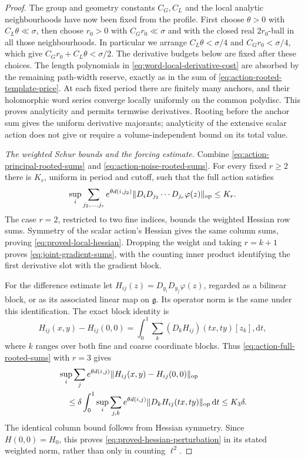 \documentclass[11pt,reqno]{amsart}
\numberwithin{equation}{section}
\theoremstyle{definition}
\theoremstyle{remark}
\newcommand{\dd}{\mathrm d}
\newcommand{\g}{\mathfrak g}
\begin{document}
\begin{proof}
The group and geometry constants \(C_G,C_L\) and the local
analytic neighbourhoods have now been fixed from the profile.
First choose \(\theta>0\) with \(C_L\theta\ll\sigma\),
then choose \(r_0>0\) with \(C_Gr_0\ll\sigma\) and with
the closed real \(2r_0\)-ball in all those neighbourhoods.
In particular we arrange
\(C_L\theta<\sigma/4\) and \(C_Gr_0<\sigma/4\), which give
\(C_Gr_0+C_L\theta<\sigma/2\).
The derivative budgets below are fixed after these choices.
The length polynomials
in \eqref{eq:word-local-derivative-cost} are absorbed by
the remaining path-width reserve, exactly as in the sum
of \eqref{eq:action-rooted-template-price}. At each fixed
period there are finitely many anchors, and their
holomorphic word series converge locally uniformly on
the common polydisc. This proves analyticity and permits
termwise derivatives. Rooting before the anchor sum
gives the uniform derivative majorants; analyticity of
the extensive scalar action does not give or require a
volume-independent bound on its total value.

\smallskip\noindent
\emph{The weighted Schur bounds and the forcing estimate.}
Combine \eqref{eq:action-principal-rooted-sums} and
\eqref{eq:action-noise-rooted-sums}. For every fixed
\(r\ge2\) there is \(K_r\), uniform in period and cutoff,
such that the full action satisfies
\begin{equation}
 \sup_i\sum_{j_2,\ldots,j_r}e^{\theta d(i,j_2)}
                \|D_iD_{j_2}\cdots D_{j_r}\varphi(z)\|_{\rm op}
                                                   \le K_r.
 \label{eq:action-full-rooted-sums}
\end{equation}
The case \(r=2\), restricted to two fine indices, bounds
the weighted Hessian row sums. Symmetry of the scalar
action's Hessian gives the same column sums, proving
\eqref{eq:proved-local-hessian}. Dropping the weight and
taking \(r=k+1\) proves \eqref{eq:joint-gradient-sums},
with the counting inner product identifying the first
derivative slot with the gradient block.

For the difference estimate let
\(H_{ij}(z)=D_{y_i}D_{y_j}\varphi(z)\), regarded as a
bilinear block, or as its associated linear map on
\(\g\). Its operator norm is the same under this
identification. The exact block identity is
\begin{equation}
 H_{ij}(x,y)-H_{ij}(0,0)
       =\int_0^1\sum_k(D_kH_{ij})(tx,ty)[z_k],\dd t,
 \label{eq:action-block-Hessian-integral}
\end{equation}
where \(k\) ranges over both fine and coarse coordinate
blocks. Thus \eqref{eq:action-full-rooted-sums} with
\(r=3\) gives
\begin{align}
 &\sup_i\sum_j e^{\theta d(i,j)}
                 \|H_{ij}(x,y)-H_{ij}(0,0)\|_{\rm op}\notag\\
 &\quad\le\delta\int_0^1\sup_i\sum_{j,k}e^{\theta d(i,j)}
                        \|D_kH_{ij}(tx,ty)\|_{\rm op}\,\dd t
        \le K_3\delta .
 \label{eq:action-weighted-Hessian-difference}
\end{align}
The identical column bound follows from Hessian symmetry.
Since \(H(0,0)=H_0\), this proves
\eqref{eq:proved-hessian-perturbation} in its stated
weighted norm, rather than only in counting \(\ell^2\).


\end{proof}
\end{document}
